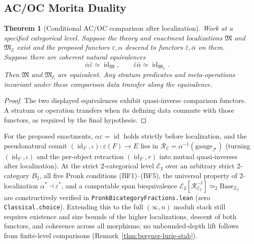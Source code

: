 \documentclass[11pt]{article}
\theoremstyle{plain}
\newtheorem{theorem}{Theorem}[section]
\theoremstyle{definition}
\newcommand{\cF}{\mathcal{F}}
\newcommand{\fM}{\mathfrak{M}}
\newcommand{\cE}{\mathcal{E}}
\DeclareMathOperator{\id}{id}
\begin{document}
\subsection{AC/OC Morita Duality}

\begin{theorem}[Conditional AC/OC comparison after localization]\label{thm:ac-oc-duality}
Work at a specified categorical level. Suppose the theory and enactment localizations $\fM$ and $\fM_\cE$ exist and the proposed functors $\varepsilon,\alpha$ descend to functors $\bar\varepsilon,\bar\alpha$ on them. Suppose there are coherent natural equivalences
\[
 \bar\alpha\bar\varepsilon\simeq\id_{\fM},\qquad
 \bar\varepsilon\bar\alpha\simeq\id_{\fM_\cE}.
\]
Then $\fM$ and $\fM_\cE$ are equivalent. Any stratum predicates and meta-operations invariant under these comparison data transfer along the equivalence.
\end{theorem}
\begin{proof}
The two displayed equivalences exhibit quasi-inverse comparison functors. A stratum or operation transfers when its defining data commute with those functors, as required by the final hypothesis.
\end{proof}
For the proposed enactments, $\alpha\varepsilon=\id$ holds strictly before localization, and the pseudonatural counit $(\id_F, \iota) : \varepsilon(F) \to E$ lies in $\mathcal{R}_\cE = \alpha^{-1}(\mathrm{gauge}_\cF)$ (turning $(\id_F, \iota)$ and the per-object retraction $(\id_F, r)$ into mutual quasi-inverses after localization). At the strict $2$-categorical level $\cE_2$ over an arbitrary strict $2$-category $B_2$, all five Pronk conditions (BF1)--(BF5), the universal property of $2$-localization $\alpha^* \dashv \varepsilon^*$, and a computable span biequivalence $\cE_2[\mathcal{R}_{\cE_2}^{-1}] \simeq_2 \mathrm{Base}_{\mathbb{Z}_2}$ are constructively verified in \texttt{PronkBicategoryFractions.lean} (zero \texttt{Classical.choice}). Extending this to the full $(\infty, n)$ moduli stack still requires existence and size bounds of the higher localizations, descent of both functors, and coherence across all morphisms; no unbounded-depth lift follows from finite-level comparisons (Remark~\ref{thm:bergner-lurie-stab}).
\end{document}
